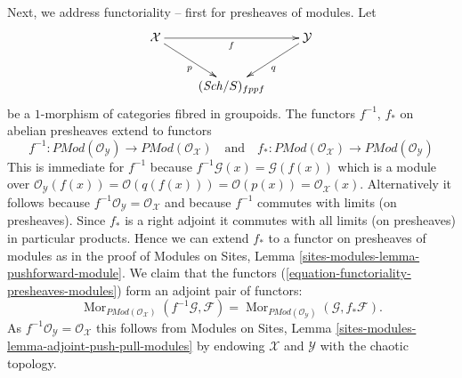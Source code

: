 \documentclass{stacks-project}
\theoremstyle{plain}
\theoremstyle{definition}
\theoremstyle{remark}
\numberwithin{equation}{subsection}
\def\Sch{\mathit{Sch}}
\def\Mor{\mathop{\mathrm{Mor}}\nolimits}
\begin{document}
\medskip\noindent
Next, we address functoriality -- first for presheaves of modules. Let
$$
\xymatrix{
\mathcal{X} \ar[rr]_f \ar[rd]_p & &  \mathcal{Y} \ar[ld]^q \\
& (\Sch/S)_{fppf}
}
$$
be a $1$-morphism of categories fibred in groupoids.
The functors $f^{-1}$, $f_*$ on abelian presheaves extend to functors
\begin{equation}
\label{equation-functoriality-presheaves-modules}
f^{-1} :
\textit{PMod}(\mathcal{O}_\mathcal{Y})
\longrightarrow
\textit{PMod}(\mathcal{O}_\mathcal{X})
\quad\text{and}\quad
f_* :
\textit{PMod}(\mathcal{O}_\mathcal{X})
\longrightarrow
\textit{PMod}(\mathcal{O}_\mathcal{Y})
\end{equation}
This is immediate for $f^{-1}$ because
$f^{-1}\mathcal{G}(x) = \mathcal{G}(f(x))$ which is a module over
$\mathcal{O}_\mathcal{Y}(f(x)) = \mathcal{O}(q(f(x))) = \mathcal{O}(p(x)) =
\mathcal{O}_\mathcal{X}(x)$. Alternatively it follows because
$f^{-1}\mathcal{O}_\mathcal{Y} = \mathcal{O}_\mathcal{X}$
and because $f^{-1}$ commutes with limits (on presheaves).
Since $f_*$ is a right adjoint it commutes with all limits
(on presheaves) in particular products. Hence we can extend
$f_*$ to a functor on presheaves of modules as in the proof of
Modules on Sites, Lemma \ref{sites-modules-lemma-pushforward-module}.
We claim that the functors (\ref{equation-functoriality-presheaves-modules})
form an adjoint pair of functors:
$$
\Mor_{\textit{PMod}(\mathcal{O}_\mathcal{X})}(
f^{-1}\mathcal{G}, \mathcal{F})
=
\Mor_{\textit{PMod}(\mathcal{O}_\mathcal{Y})}(
\mathcal{G}, f_*\mathcal{F}).
$$
As $f^{-1}\mathcal{O}_\mathcal{Y} = \mathcal{O}_\mathcal{X}$
this follows from
Modules on Sites, Lemma \ref{sites-modules-lemma-adjoint-push-pull-modules}
by endowing $\mathcal{X}$ and $\mathcal{Y}$ with the chaotic
topology.
\end{document}
